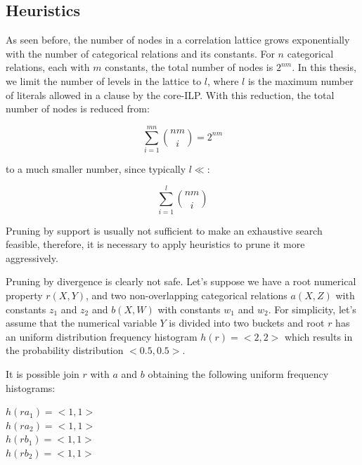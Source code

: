 \subsection{Heuristics}
\label{sec:heuristics}

As seen before, the number of nodes in a correlation lattice grows exponentially with the number of categorical
relations and its constants. For $n$ categorical relations, each with $m$ constants, the total number of nodes is
$2^{nm}$. In this thesis, we limit the number of levels in the lattice to $l$, where $l$ is the maximum number of
literals allowed in a clause by the core-ILP. With this reduction, the total number of nodes is reduced from:

\begin{center}
  \begin{equation}
    \sum_{i=1}^{mn}\binom{nm}{i} = 2^{nm}
  \end{equation}
\end{center}

to a much smaller number, since typically $l \ll $:

\begin{center}
  \begin{equation}
    \sum_{i=1}^{l}\binom{nm}{i}
  \end{equation}
\end{center}

Pruning by support is usually not sufficient to make an exhaustive search feasible, therefore, it is necessary to apply
heuristics to prune it more aggressively.


Pruning by divergence is clearly not safe. Let's suppose we have a root numerical property $r(X,Y)$, and two
non-overlapping categorical relations $a(X,Z)$ with constants $z_1$ and $z_2$ and $b(X,W)$ with constants $w_1$ and
$w_2$. For simplicity, let's assume that the numerical variable $Y$ is divided into two buckets and root $r$ has an
uniform distribution frequency histogram $h(r)=<2,2>$ which results in the probability distribution $<0.5,0.5>$.

It is possible join $r$ with $a$ and $b$ obtaining the following uniform frequency histograms:

\begin{center}
$h(ra_1)=<1,1>$ \\
$h(ra_2)=<1,1>$ \\
$h(rb_1)=<1,1>$ \\
$h(rb_2)=<1,1>$
\end{center}

